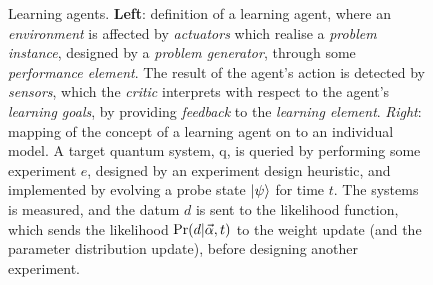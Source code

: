 \begin{figure}
\begin{minipage}[c]{0.4\textwidth}
    \end{minipage}


    \caption[Learning agents]{
        Learning agents. \textbf{Left}: definition of a learning agent, where an \emph{environment} is affected by 
        \emph{actuators} which realise a \emph{problem instance}, designed by a \emph{problem generator}, through some \emph{performance element}. 
        The result of the agent's action is detected by \emph{sensors}, which the \emph{critic} interprets with respect to
        the agent's \emph{learning goals}, by providing \emph{feedback} to the \emph{learning element}. 
        \emph{Right}: mapping of the concept of a learning agent on to an individual model. 
        A target quantum system, \gls{q}, is queried by performing some experiment $e$, 
        designed by an experiment design heuristic, and implemented by evolving a \gls{probe} state $\ket{\psi}$ for time $t$. 
        The systems is measured, and the datum $d$ is sent to the  \gls{likelihood} function, which sends the \gls{likelihood} $\Pr(d|\vec{\alpha}, t)$
        to the weight update (and the parameter distribution update), before designing another experiment. 
    }
    \label{fig:learning_agent}
\end{figure}

   